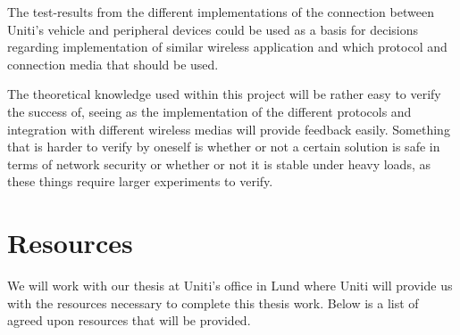 \documentclass[a4paper]{article}
\begin{document}
The test-results from the different implementations of the connection between
Uniti's vehicle and peripheral devices could be used as a basis for decisions
regarding implementation of similar wireless application and which protocol
and connection media that should be used.


The theoretical knowledge used within this project will be rather easy
to verify the success of, seeing as the implementation of the different 
protocols and integration with different wireless medias will provide
feedback easily. Something that is harder to verify by oneself is whether
or not a certain solution is safe in terms of network security or whether
or not it is stable under heavy loads, as these things require larger
experiments to verify.

\section{Resources}


We will work with our thesis at Uniti's office in Lund where Uniti will provide
us with the resources necessary to complete this thesis work. Below is a list of
agreed upon resources that will be provided.
\end{document}
